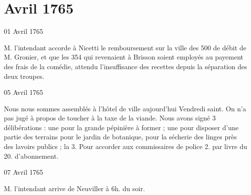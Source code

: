                   \chapter*{Avril 1765}



                     \begin{diary}{01 Avril 1765}{}


                           M. l'intendant accorde à
                              Nicetti le remboursement
                           sur la ville des 500 de débit de M. Gronier,
                           et que les 354 qui revenaient à Brisson soient
                           employés au payement des frais de la comédie,
                           attendu l'insuffisance des recettes depuis la
                           séparation des deux troupes. \bigskip


                     \end{diary}
                     \begin{diary}{05 Avril 1765}{}

                         Nous nous sommes assemblés à l'hôtel de
                              ville aujourd'hui Vendredi saint. On n'a pas
                           jugé à propos de toucher à la taxe de la
                           viande. Nous avons signé 3
                           délibérations :
                           une pour la grande
                              pépinière à former ;
                           une pour disposer d'une partie des terrains
                           pour le jardin de
                              botanique, pour la
                              sécherie
                              des linges près des lavoirs publics ; la
                           3. Pour accorder aux commissaires de police 2.
                           par livre du 20. d'abonnement. \bigskip


                     \end{diary}

                     \begin{diary}{07 Avril 1765}{}


                           M. l'intendant arrive de
                              Neuviller à 6h.
                           du soir. \bigskip


                     \end{diary}


